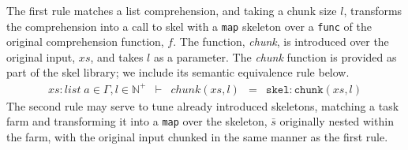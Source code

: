 \documentclass[final]{jfp1}
\newcommand{\func}[0]{\texttt{func}\xspace}
\newcommand{\map}[0]{\lstinline{map}\xspace}
\newcommand{\s}[0]{\bar{s}}
\newcommand{\bn}[0]{\mathbb{N}}
\newcommand{\bnp}[0]{\bn^{+}}
\newcommand{\type}[3]{#1: #2\; #3}
\newcommand{\ing}[1]{#1 \in{} \Gamma}
\newcommand{\seq}[3]{#1 & \vdash{} & #2 & = & #3}
\begin{document}
% 
The first rule matches a list comprehension, and taking a chunk size $l$,
transforms the comprehension into a call to skel with a \map skeleton over a
\func of the original comprehension function, $f$. The function, \emph{chunk},
is introduced over the original input, $xs$, and takes $l$ as a parameter. The
\emph{chunk} function is provided as part of the skel library; we include its
semantic equivalence rule below.
% 
\[
  \begin{array}{rclcl}
    \seq{\ing{\type{xs}{list}{a}}, l \in \bnp}{chunk(xs,
    l)}{\mathtt{skel:chunk}(xs, l)}
  \end{array}
\]
% 
The second rule may serve to tune already introduced skeletons, matching a task
farm and transforming it into a \map over the skeleton, $\s$ originally nested
within the farm, with the original input chunked in the same manner as the first
rule. 



\end{document}
